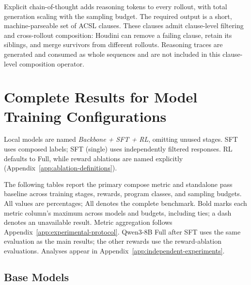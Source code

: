 Explicit chain-of-thought adds reasoning tokens to every rollout, with total
generation scaling with the sampling budget.  The required output is a short,
machine-parseable set of ACSL clauses.  These clauses admit clause-level
filtering and cross-rollout composition: Houdini can remove a failing clause,
retain its siblings, and merge survivors from different rollouts.  Reasoning
traces are generated and consumed as whole sequences and are not included in
this clause-level composition operator.

\section{Complete Results for Model Training Configurations}
\label{app:complete-results}
\label{app:latest-evaluation}
\begingroup
\setlength{\floatsep}{7pt plus 2pt minus 2pt}
\setlength{\textfloatsep}{7pt plus 2pt minus 2pt}
\setlength{\intextsep}{7pt plus 2pt minus 2pt}

Local models are named \textit{Backbone + SFT + RL}, omitting unused stages.
SFT uses composed labels; SFT (single) uses independently filtered responses.
RL defaults to Full, while reward ablations are named explicitly
(Appendix~\ref{app:ablation-definitions}).

The following tables report the primary compose metric and standalone pass
baseline across training stages, rewards, program classes, and sampling budgets. All values are percentages; All denotes
the complete benchmark. Bold marks each metric column's maximum across models
and budgets, including ties; a dash denotes an unavailable result.
Metric aggregation follows Appendix~\ref{app:experimental-protocol}.
Qwen3-8B Full after SFT uses the same evaluation as the main results;
the other rewards use the reward-ablation evaluations.
Analyses appear in Appendix~\ref{app:independent-experiments}.

\subsection{Base Models}
\label{app:probe-curves}

